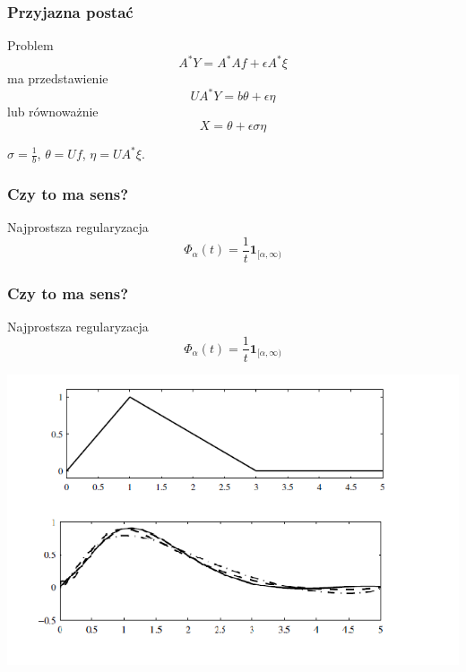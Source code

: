 \documentclass{beamer}
\begin{document}
\begin{frame}\frametitle{Przyjazna postać}
\begin{block}{}
Problem
\begin{displaymath}
A^*Y=A^*Af+\epsilon A^*\xi
\end{displaymath}
ma przedstawienie
\begin{displaymath}
UA^*Y=b\theta+\epsilon\eta
\end{displaymath}
lub równoważnie
\begin{displaymath}
X=\theta+\epsilon\sigma\eta
\end{displaymath}
\end{block}
\begin{center}
$\sigma=\frac{1}{b}$, $\theta=Uf$, $\eta=UA^*\xi$.
\end{center}
\end{frame}

\begin{frame}\frametitle{Czy to ma sens?}
\begin{block}{Najprostsza regularyzacja}
\begin{displaymath}
\Phi_{\alpha}(t)=\frac{1}{t}\pmb{1}_{[\alpha,\infty)}
\end{displaymath}
\end{block}
\end{frame}



\begin{frame}\frametitle{Czy to ma sens?}
\begin{block}{Najprostsza regularyzacja}
\begin{displaymath}
\Phi_{\alpha}(t)=\frac{1}{t}\pmb{1}_{[\alpha,\infty)}
\end{displaymath}
\end{block}
\begin{center}
\includegraphics[scale=0.45]{8}
\end{center}
\end{frame}
\end{document}
